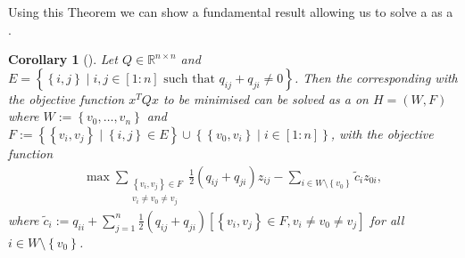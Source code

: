 \documentclass[12pt,a4paper]{article}
\theoremstyle{mythm}
\newtheorem{cor}[thm]{Corollary}
\begin{document}
Using this Theorem we can show a fundamental result allowing us to solve a \BQP as a \MCP. 
\begin{cor}[{\cite[p. 2]{MallachLectureNotes}}]
\label{cor:bqp2mcp} 
Let $ Q \in \mathbb{R} ^{ n \times n }  $ and $ E = \left\{ \left\{ i,j \right\}  \mid i,j \in \left[ 1:n \right] \text{ such that } q _{ ij } + q _{ ji } \neq 0  \right\}  $.
Then the corresponding \BQP with the objective function $ x ^T Q x $ to be minimised can be solved as a \MCP on $ H = \left( W,F \right)  $ where $ W := \left\{ v_0,
\dots, v_n \right\}  $ and $ F := \left\{ \left\{ v_i,v_j \right\}  \mid \left\{ i,j \right\} \in E \right\} \cup \left\{ \left\{ v_0,v_i \right\}  \mid i \in \left[ 1:n
\right]   \right\}  $, with the objective function
\begin{align*}
\max \sum_{  \substack{ \left\{ v_i,v_j \right\} \in F \\ v_i \neq v_0 \neq v_j	 }  }^{  } \frac{ 1 }{ 2 } \left( q _{ ij } + q _{ ji }  \right) z _{ ij } - \sum_{ i \in W
\setminus \left\{  v_0  \right\} }^{  } \widetilde{ c } _{ i } z _{ 0i },
\end{align*} 
where $ \widetilde{ c }_i := q _{ ii } + \sum_{ j=1  }^{ n } \frac{ 1 }{ 2 } \left( q _{ ij } + q _{ ji }  \right) \left[ \left\{ v_i , v_j \right\} \in F, v_i \neq v_0 \neq v_j
\right]  $ for all $ i \in W \setminus \left\{ v_0 \right\}  $.
\end{cor} 
\end{document}
